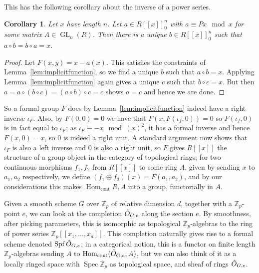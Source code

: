 \documentclass{article}
\newcommand{\Z}{\mathbb{Z}}
\DeclareMathOperator{\Hom}{Hom}
\DeclareMathOperator{\Spec}{Spec}
\DeclareMathOperator{\Spf}{Spf}
\DeclareMathOperator{\GL}{GL}
\theoremstyle{plain}
\newtheorem{cor}[thm]{Corollary} %
\theoremstyle{definition}
\theoremstyle{remark}
\begin{document}
This has the following corollary about the inverse of a power series.
\begin{cor}
\label{lem:formalinverse}
Let $x$ have length $n$. Let $a \in R[[x]]_0^n$ with $a \equiv Px \mod x$ for some matrix $A\in \GL_n(R)$. Then there is a unique $b \in R[[x]]_0^n$ such that $a \circ b = b \circ a = x$.
\end{cor}
\begin{proof}
Let $F(x,y) = x - a(x)$. This satisfies the constraints of Lemma~\ref{lem:implicitfunction}, so we find a unique $b$ such that $a \circ b = x$. Applying Lemma~\ref{lem:implicitfunction} again gives a unique $c$ such that $b \circ c = x$. But then $a = a \circ (b \circ c) = (a \circ b) \circ c = c$ shows $a = c$ and hence we are done.
\end{proof}
So a formal group $F$ does by Lemma~\ref{lem:implicitfunction} indeed have a right inverse $\iota_F$. Also, by $F(0,0) = 0$ we have that $F(x,F(\iota_f,0)) = 0$ so $F(\iota_f,0)$ is in fact equal to $\iota_F$; as $\iota_F \equiv -x \mod (x)^2$, it has a formal inverse and hence $F(x,0) = x$, so $0$ is indeed a right unit. A standard argument now shows that $\iota_F$ is also a left inverse and $0$ is also a right unit, so $F$ gives $R[[x]]$ the structure of a group object in the category of topological rings; for two continuous morphisms $f_1,f_2$ from $R[[x]]$ to some ring $A$, given by sending $x$ to $a_1,a_2$ respectively, we define $(f_1 \oplus f_2)(x) = F(a_1,a_2)$, and by our considerations this makes $\Hom_{\text{cont}}{R,A}$ into a group, functorially in $A$.

Given a smooth scheme $G$ over $\Z_p$ of relative dimension $d$, together with a $\Z_p$-point $e$, we can look at the completion $\Hat{O}_{G,e}$ along the section $e$. By smoothness, after picking parameters, this is isomorphic as topological $\Z_p$-algebras to the ring of power series $\Z_p[[x_1,\dots,x_d]]$. This completion naturally gives rise to a formal scheme denoted $\Spf \Hat{O}_{G,e}$; in a categorical notion, this is a functor on finite length $\Z_p$-algebras sending $A$ to $\Hom_{\text{cont}}(\Hat{O}_{G,e},A)$, but we can also think of it as a locally ringed space with $\Spec \Z_p$ as topological space, and sheaf of rings $\Hat{O}_{G,e}$. 
\end{document}
